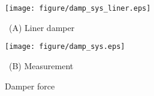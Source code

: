 \documentclass{article_vdlab_sotsuron_youshi}
\begin{document}
\vspace{0mm}
\begin{figure}[h]
  \begin{minipage}{0.5\hsize}
   \centering
   \texttt{[image: figure/damp\_sys\_liner.eps]}
  \begin{center}
    \vspace{-4mm}
      \ (A) Liner damper \
      \end{center}
  \end{minipage}
  \begin{minipage}{0.5\hsize}
   \centering
   \texttt{[image: figure/damp\_sys.eps]}
  \begin{center}
    \vspace{-4mm}
      \ (B) Measurement \
      \end{center}
    \end{minipage}
  \vspace{-2mm}
  \caption{Damper force}
  \label{fig:damp_sys}
\end{figure}

\end{document}
